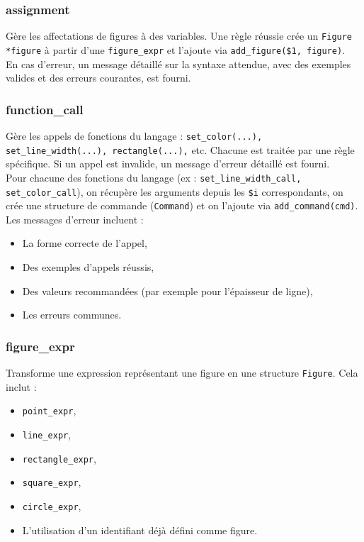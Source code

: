 \documentclass[12pt,a4paper]{article}
\begin{document}
\subsubsection{assignment}
Gère les affectations de figures à des variables. Une règle réussie crée un \texttt{Figure *figure} à partir d’une \texttt{figure\_expr} et l’ajoute via \texttt{add\_figure(\$1, figure)}. \\

En cas d’erreur, un message détaillé sur la syntaxe attendue, avec des exemples valides et des erreurs courantes, est fourni.

\subsubsection{function\_call}
Gère les appels de fonctions du langage : \texttt{set\_color(...), set\_line\_width(...), rectangle(...),} etc. Chacune est traitée par une règle spécifique. Si un appel est invalide, un message d’erreur détaillé est fourni. \\

Pour chacune des fonctions du langage (ex : \texttt{set\_line\_width\_call, set\_color\_call}), on récupère les arguments depuis les \texttt{\$i} correspondants, on crée une structure de commande (\texttt{Command}) et on l’ajoute via \texttt{add\_command(cmd)}. \\

Les messages d’erreur incluent :
\begin{itemize}
    \item La forme correcte de l’appel,
    \item Des exemples d’appels réussis,
    \item Des valeurs recommandées (par exemple pour l’épaisseur de ligne),
    \item Les erreurs communes.
\end{itemize}

\subsubsection{figure\_expr}
Transforme une expression représentant une figure en une structure \texttt{Figure}. Cela inclut :
\begin{itemize}
    \item \texttt{point\_expr},
    \item \texttt{line\_expr},
    \item \texttt{rectangle\_expr},
    \item \texttt{square\_expr},
    \item \texttt{circle\_expr},
    \item L’utilisation d’un identifiant déjà défini comme figure.
\end{itemize}
\end{document}
